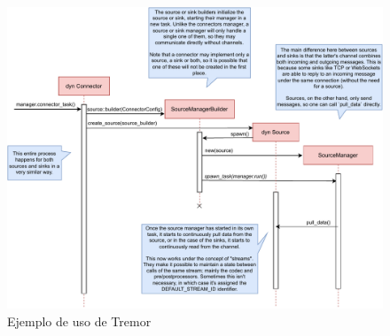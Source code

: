 \begin{figure}
    \centering
    \includegraphics[width=\textwidth]{./Imagenes/setting-up.pdf}
    \caption{Ejemplo de uso de Tremor}%
    \label{fig:tremor_setting_up}
\end{figure}
